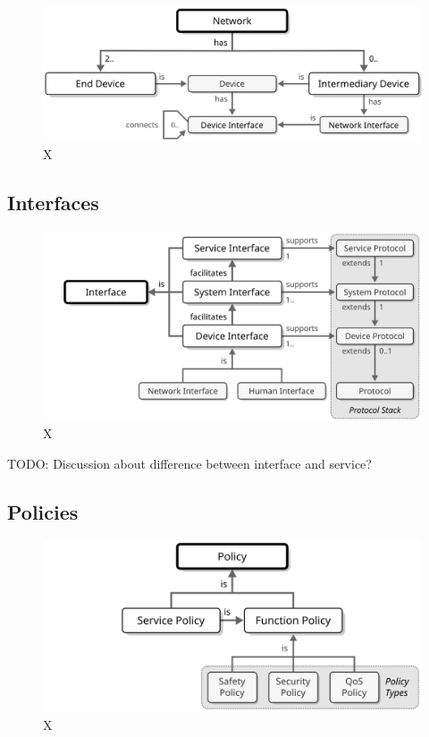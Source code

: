 \begin{figure}[ht!]
  \centering
  \includegraphics{figures/network}
  \caption{
    X
  }
  \label{fig:network}
\end{figure}

\subsection{Interfaces}

\begin{figure}[ht!]
  \centering
  \includegraphics{figures/interface}
  \caption{
    X
  }
  \label{fig:interface}
\end{figure}

TODO: Discussion about difference between interface and service?

\subsection{Policies}

\begin{figure}[ht!]
  \centering
  \includegraphics{figures/policy}
  \caption{
    X
  }
  \label{fig:policy}
\end{figure}

